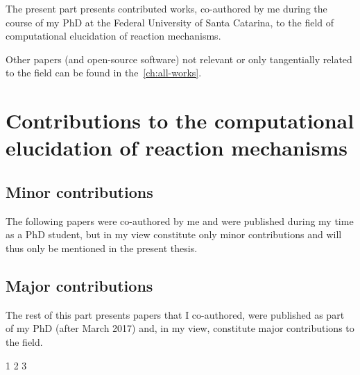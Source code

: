 The present part presents contributed works,
co-authored by me during the course of my PhD
at the Federal University of Santa Catarina,
to the field of computational elucidation of reaction mechanisms.

Other papers
(and open-source software)
not relevant or only tangentially related to the field
can be found in the~\cref{ch:all-works}.

\section{Contributions to the computational elucidation of
  reaction mechanisms}%
\label{sec:contributions}

\subsection{Minor contributions}%
\label{sec:minor-contributions}
The following papers were co-authored by me and were published
during my time as a PhD student,
but in my view constitute only minor contributions and
will thus only be mentioned in the present thesis.


\subsection{Major contributions}%
\label{sec:major-contributions}
The rest of this part presents papers that I co-authored, were published as
part of my PhD (after March 2017) and, in my view, constitute major contributions
to the field.

{1}
{2}
{3}
